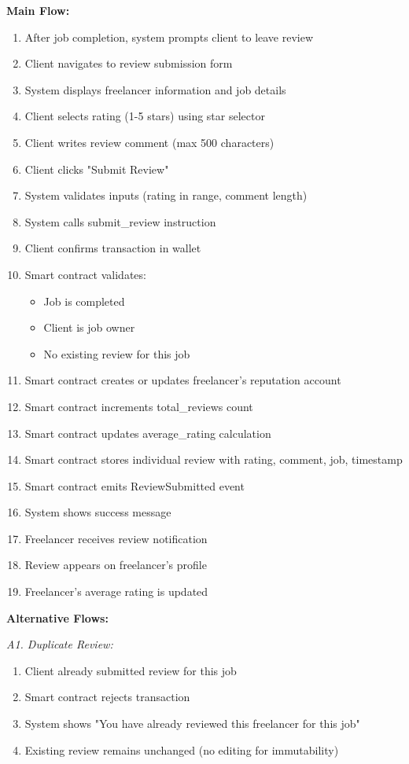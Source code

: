 \documentclass[a4paper,13pt,twoside]{report}
\theoremstyle{definition}
\begin{document}
\textbf{Main Flow:}
\begin{enumerate}
    \item After job completion, system prompts client to leave review
    \item Client navigates to review submission form
    \item System displays freelancer information and job details
    \item Client selects rating (1-5 stars) using star selector
    \item Client writes review comment (max 500 characters)
    \item Client clicks "Submit Review"
    \item System validates inputs (rating in range, comment length)
    \item System calls submit\_review instruction
    \item Client confirms transaction in wallet
    \item Smart contract validates:
    \begin{itemize}
        \item Job is completed
        \item Client is job owner
        \item No existing review for this job
    \end{itemize}
    \item Smart contract creates or updates freelancer's reputation account
    \item Smart contract increments total\_reviews count
    \item Smart contract updates average\_rating calculation
    \item Smart contract stores individual review with rating, comment, job, timestamp
    \item Smart contract emits ReviewSubmitted event
    \item System shows success message
    \item Freelancer receives review notification
    \item Review appears on freelancer's profile
    \item Freelancer's average rating is updated
\end{enumerate}

\textbf{Alternative Flows:}

\textit{A1. Duplicate Review:}
\begin{enumerate}
    \item Client already submitted review for this job
    \item Smart contract rejects transaction
    \item System shows "You have already reviewed this freelancer for this job"
    \item Existing review remains unchanged (no editing for immutability)
\end{enumerate}
\end{document}
